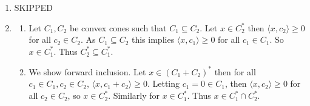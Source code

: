 \begin{enumerate}
\begin{itemize}
                    \[|(X_1)_{ij}| \leq 1 \text{ and } |(X_2)_{ij}| \leq 1.\]
                    Then
                    \begin{align*}
                        |\lambda (X_1)_{ij} + (1 - \lambda)(X_2)_{ij}| & \leq \lambda |(X_1)_{ij}| + (1 - \lambda)|(X_2)_{ij}| \\
                                                                       & \leq \lambda 1 + (1 - \lambda)                        \\
                                                                       & = 1
                    \end{align*}
                    So, \(\Omega_0\) is convex. Since \(S_+^n\) is convex, then the intersection of two convex sets is convex, i.e. \(\Omega\) is convex.
              \item Bounded. For all \(X \in \Omega\), \(|X_{ij} \leq 1, i,j = 1, \dots, n\). So, \(\norm{X}_F = \left[\sum_{i,j} |X_{ij}|^2\right]^\frac{1}{2} \leq n\) for all \(X \in \Omega\). Thus \(\Omega \subseteq \{X : \norm{X}_F \leq n\}\) and so \(\Omega\) is a bounded set.
          \end{itemize}

    \item {\color{red} SKIPPED}
    \item \begin{enumerate}[label=(\arabic*)]
              \item Let \(C_1, C_2\) be convex cones such that \(C_1 \subseteq C_2\). Let \(x \in C_2^*\) then \(\langle x, c_2 \rangle \geq 0\) for all \(c_2 \in C_2\). As \(C_1 \subseteq C_2\) this implies \(\langle x, c_1 \rangle \geq 0\) for all \(c_1 \in C_1\). So \(x \in C_1^*\). Thus \(C_2^* \subseteq C_1^*\).
              \item We show forward inclusion. Let \(x \in (C_1 + C_2)^*\) then for all \(c_1 \in C_1, c_2 \in C_2\), \(\langle x, c_1 + c_2\rangle \geq 0\). Letting \(c_1 = 0 \in C_1\), then \(\langle x, c_2 \rangle \geq 0\) for all \(c_2 \in C_2\), so \(x \in C_2^*\). Similarly for \(x \in C_1^*\). Thus \(x \in C_1^* \cap C_2^*\). \\


\end{enumerate}
\end{enumerate}
